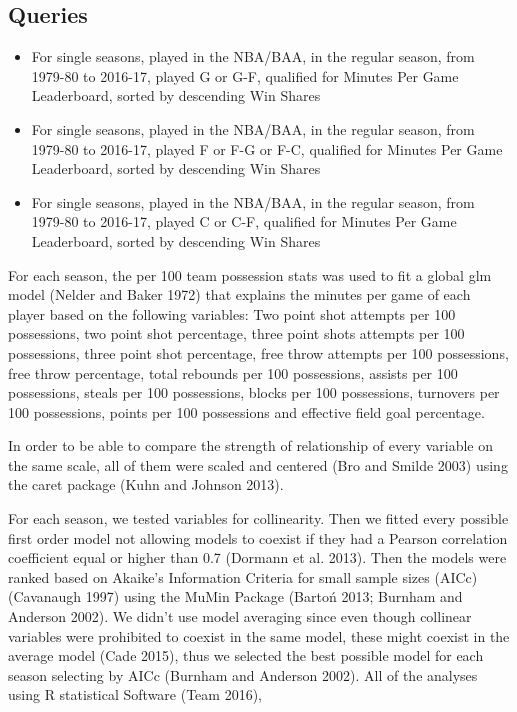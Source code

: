 \documentclass[]{elsarticle} %
\begin{document}
\subsection{Queries}\label{queries}

\begin{itemize}
\item
  For single seasons, played in the NBA/BAA, in the regular season, from
  1979-80 to 2016-17, played G or G-F, qualified for Minutes Per Game
  Leaderboard, sorted by descending Win Shares
\item
  For single seasons, played in the NBA/BAA, in the regular season, from
  1979-80 to 2016-17, played F or F-G or F-C, qualified for Minutes Per
  Game Leaderboard, sorted by descending Win Shares
\item
  For single seasons, played in the NBA/BAA, in the regular season, from
  1979-80 to 2016-17, played C or C-F, qualified for Minutes Per Game
  Leaderboard, sorted by descending Win Shares
\end{itemize}

For each season, the per 100 team possession stats was used to fit a
global glm model (Nelder and Baker 1972) that explains the minutes per
game of each player based on the following variables: Two point shot
attempts per 100 possessions, two point shot percentage, three point
shots attempts per 100 possessions, three point shot percentage, free
throw attempts per 100 possessions, free throw percentage, total
rebounds per 100 possessions, assists per 100 possessions, steals per
100 possessions, blocks per 100 possessions, turnovers per 100
possessions, points per 100 possessions and effective field goal
percentage.

In order to be able to compare the strength of relationship of every
variable on the same scale, all of them were scaled and centered (Bro
and Smilde 2003) using the caret package (Kuhn and Johnson 2013).

For each season, we tested variables for collinearity. Then we fitted
every possible first order model not allowing models to coexist if they
had a Pearson correlation coefficient equal or higher than 0.7 (Dormann
et al. 2013). Then the models were ranked based on Akaike's Information
Criteria for small sample sizes (AICc) (Cavanaugh 1997) using the MuMin
Package (Barto{ń} 2013; Burnham and Anderson 2002). We didn't use model
averaging since even though collinear variables were prohibited to
coexist in the same model, these might coexist in the average model
(Cade 2015), thus we selected the best possible model for each season
selecting by AICc (Burnham and Anderson 2002). All of the analyses using
R statistical Software (Team 2016),
\end{document}
